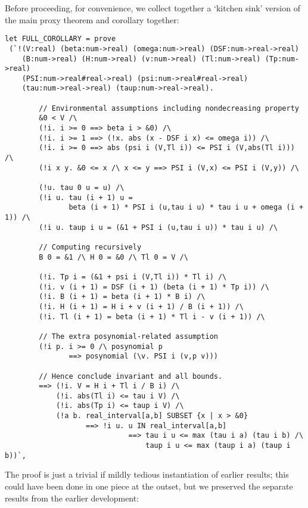 \documentclass[10pt]{article}
\theoremstyle{definition}
\theoremstyle{remark}
\numberwithin{equation}{section}
\begin{document}
Before proceeding, for convenience, we collect together a `kitchen sink'
version of the main proxy theorem and corollary together:

\begin{scriptsize}\begin{verbatim}
let FULL_COROLLARY = prove
 (`!(V:real) (beta:num->real) (omega:num->real) (DSF:num->real->real)
    (B:num->real) (H:num->real) (v:num->real) (Tl:num->real) (Tp:num->real)
    (PSI:num->real#real->real) (psi:num->real#real->real)
    (tau:num->real->real) (taup:num->real->real).

        // Environmental assumptions including nondecreasing property
        &0 < V /\
        (!i. i >= 0 ==> beta i > &0) /\
        (!i. i >= 1 ==> (!x. abs (x - DSF i x) <= omega i)) /\
        (!i. i >= 0 ==> abs (psi i (V,Tl i)) <= PSI i (V,abs(Tl i))) /\
        (!i x y. &0 <= x /\ x <= y ==> PSI i (V,x) <= PSI i (V,y)) /\

        (!u. tau 0 u = u) /\
        (!i u. tau (i + 1) u =
               beta (i + 1) * PSI i (u,tau i u) * tau i u + omega (i + 1)) /\
        (!i u. taup i u = (&1 + PSI i (u,tau i u)) * tau i u) /\

        // Computing recursively
        B 0 = &1 /\ H 0 = &0 /\ Tl 0 = V /\

        (!i. Tp i = (&1 + psi i (V,Tl i)) * Tl i) /\
        (!i. v (i + 1) = DSF (i + 1) (beta (i + 1) * Tp i)) /\
        (!i. B (i + 1) = beta (i + 1) * B i) /\
        (!i. H (i + 1) = H i + v (i + 1) / B (i + 1)) /\
        (!i. Tl (i + 1) = beta (i + 1) * Tl i - v (i + 1)) /\

        // The extra posynomial-related assumption
        (!i p. i >= 0 /\ posynomial p
               ==> posynomial (\v. PSI i (v,p v)))

        // Hence conclude invariant and all bounds.
        ==> (!i. V = H i + Tl i / B i) /\
            (!i. abs(Tl i) <= tau i V) /\
            (!i. abs(Tp i) <= taup i V) /\
            (!a b. real_interval[a,b] SUBSET {x | x > &0}
                   ==> !i u. u IN real_interval[a,b]
                             ==> tau i u <= max (tau i a) (tau i b) /\
                                 taup i u <= max (taup i a) (taup i b))`,
\end{verbatim}\end{scriptsize}

The proof is just a trivial if mildly tedious instantiation of earlier results;
this could have been done in one piece at the outset, but we preserved the
separate results from the earlier development:
\end{document}
